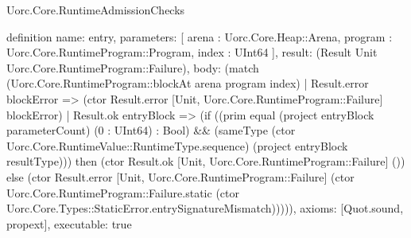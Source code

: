 \begin{lexlean}{Uorc.Core.RuntimeAdmissionChecks}
\begin{semanticmodule}
definition{
  name: entry,
  parameters: [
    arena : Uorc.Core.Heap::Arena,
    program : Uorc.Core.RuntimeProgram::Program,
    index : UInt64
  ],
  result: (Result Unit Uorc.Core.RuntimeProgram::Failure),
  body: (match (Uorc.Core.RuntimeProgram::blockAt arena program index)
    | Result.error blockError => (ctor Result.error [Unit, Uorc.Core.RuntimeProgram::Failure] blockError)
    | Result.ok entryBlock => (if ((prim equal (project entryBlock parameterCount) (0 : UInt64) : Bool) && (sameType (ctor Uorc.Core.RuntimeValue::RuntimeType.sequence) (project entryBlock resultType))) then (ctor Result.ok [Unit, Uorc.Core.RuntimeProgram::Failure] ()) else (ctor Result.error [Unit, Uorc.Core.RuntimeProgram::Failure] (ctor Uorc.Core.RuntimeProgram::Failure.static (ctor Uorc.Core.Types::StaticError.entrySignatureMismatch))))),
  axioms: [Quot.sound, propext],
  executable: true
}
\end{semanticmodule}
\end{lexlean}
